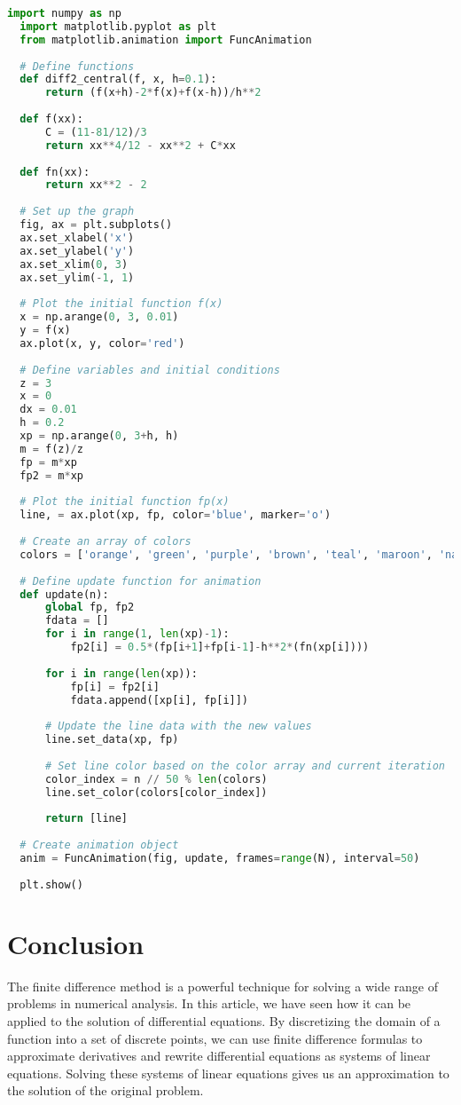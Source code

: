 \documentclass{article}
\begin{document}
\begin{lstlisting}[language=Python]
  import numpy as np
  import matplotlib.pyplot as plt
  from matplotlib.animation import FuncAnimation
  
  # Define functions
  def diff2_central(f, x, h=0.1):
      return (f(x+h)-2*f(x)+f(x-h))/h**2
  
  def f(xx):
      C = (11-81/12)/3
      return xx**4/12 - xx**2 + C*xx
  
  def fn(xx):
      return xx**2 - 2
  
  # Set up the graph
  fig, ax = plt.subplots()
  ax.set_xlabel('x')
  ax.set_ylabel('y')
  ax.set_xlim(0, 3)
  ax.set_ylim(-1, 1)
  
  # Plot the initial function f(x)
  x = np.arange(0, 3, 0.01)
  y = f(x)
  ax.plot(x, y, color='red')
  
  # Define variables and initial conditions
  z = 3
  x = 0
  dx = 0.01
  h = 0.2
  xp = np.arange(0, 3+h, h)
  m = f(z)/z
  fp = m*xp
  fp2 = m*xp
  
  # Plot the initial function fp(x)
  line, = ax.plot(xp, fp, color='blue', marker='o')
  
  # Create an array of colors
  colors = ['orange', 'green', 'purple', 'brown', 'teal', 'maroon', 'navy']
  
  # Define update function for animation
  def update(n):
      global fp, fp2
      fdata = []
      for i in range(1, len(xp)-1):
          fp2[i] = 0.5*(fp[i+1]+fp[i-1]-h**2*(fn(xp[i])))
  
      for i in range(len(xp)):
          fp[i] = fp2[i]
          fdata.append([xp[i], fp[i]])
  
      # Update the line data with the new values
      line.set_data(xp, fp)
  
      # Set line color based on the color array and current iteration
      color_index = n // 50 % len(colors)
      line.set_color(colors[color_index])
  
      return [line]
  
  # Create animation object
  anim = FuncAnimation(fig, update, frames=range(N), interval=50)
  
  plt.show()
  \end{lstlisting}

\section{Conclusion}

The finite difference method is a powerful technique for solving a wide range of problems in numerical analysis. In this article, we have seen how it can be applied to the solution of differential equations. By discretizing the domain of a function into a set of discrete points, we can use finite difference formulas to approximate derivatives and rewrite differential equations as systems of linear equations. Solving these systems of linear equations gives us an approximation to the solution of the original problem.
\end{document}
